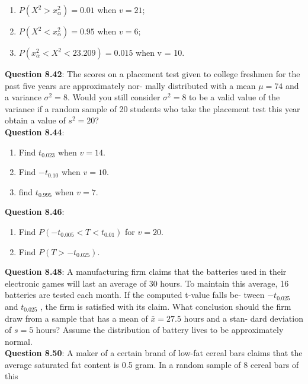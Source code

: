\documentclass{article}
\begin{document}
        \begin{enumerate}[label = (\alph*) ]
            \item $P(X^2 > x^{2}_{\alpha}) = 0.01$ when $v = 21$;
            \item $P(X^2 < x^{2}_{\alpha}) = 0.95$ when $v = 6$;
            \item $P(x^{2}_{\alpha} < X^2 < 23.209) = 0.015$ when v = 10.
        \end{enumerate}
    \textbf{Question 8.42}: The scores on a placement test given to college
    freshmen for the past five years are approximately nor-
    mally distributed with a mean $\mu = 74$ and a variance
    $\sigma^2 = 8$. Would you still consider $\sigma^2 = 8$ to be a valid
    value of the variance if a random sample of 20 students
    who take the placement test this year obtain a value of
    $s^2 = 20$?\\\newline
    \textbf{Question 8.44}:
        \begin{enumerate}[label = (\alph*) ]
            \item Find $t_{0.023}$ when $v = 14$.
            \item Find $-t_{0.10}$ when $v = 10$.
            \item find $t_0.995$ when $v = 7$.
        \end{enumerate}
    \textbf{Question 8.46}:
        \begin{enumerate}[label = (\alph*) ]
            \item Find $P(-t_{0.005} < T < t_{0.01})$ for $v = 20$.
            \item Find $P(T > -t_{0.025})$.
        \end{enumerate}
    \textbf{Question 8.48}: A manufacturing firm claims that the batteries
    used in their electronic games will last an average of
    30 hours. To maintain this average, 16 batteries are
    tested each month. If the computed t-value falls be-
    tween $-t_{0.025}$ and $t_{0.025}$ , the firm is satisfied with its
    claim. What conclusion should the firm draw from a
    sample that has a mean of $\bar{x} = 27.5$ hours and a stan-
    dard deviation of $s = 5$ hours? Assume the distribution
    of battery lives to be approximately normal.\\\newline
    \textbf{Question 8.50}: A maker of a certain brand of low-fat cereal bars
    claims that the average saturated fat content is 0.5
    gram. In a random sample of 8 cereal bars of this
\end{document}
